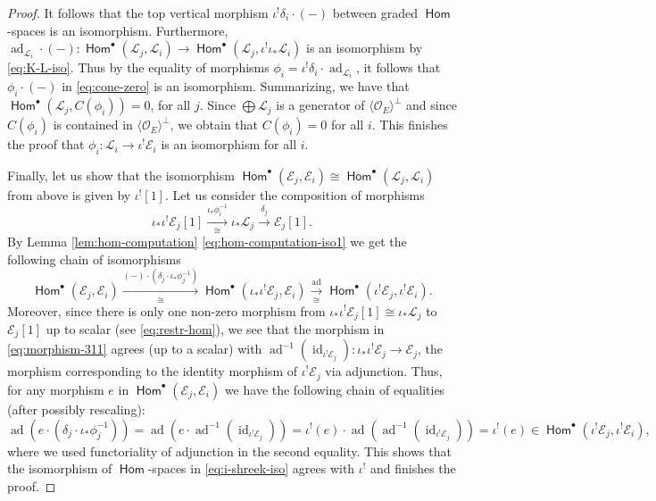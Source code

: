 \documentclass[a4paper,11pt, reqno]{amsart}
\def\OO{\mathcal O}
\def\sE{\mathscr{E}}
\def\sL{\mathscr{L}}
\def\id{{\operatorname{id}}}
\def\ad{{\operatorname{ad}}}
\newcommand{\opname}[1]{\operatorname{\mathsf{#1}}}
\newcommand{\Hom}{\opname{Hom}}
\theoremstyle{plain}
\theoremstyle{definition}
\numberwithin{equation}{section}
\newlength{\arrow}
\begin{document}
\begin{proof}
It follows that the top vertical morphism $  \iota^! \delta_i  \cdot (-)$ between graded $\Hom$-spaces is an isomorphism.
Furthermore,  $ \ad_{\sL_i } \cdot (-) : \Hom^\bullet ( \sL_j , \sL_i  ) \to \Hom^\bullet (  \sL_j , \iota^! \iota_\ast\sL_i )$ is an isomorphism by \eqref{eq:K-L-iso}.
Thus by the equality of morphisms $\phi_ i =   \iota^! \delta_i \cdot \ad_{\sL_i }$, it follows that 
$ \phi_i \cdot (- ) $ in \eqref{eq:cone-zero}
is an isomorphism.
Summarizing, we have that $\Hom^\bullet (  \sL_j , C ( \phi_i )  ) = 0$, for all $j$.
Since $\bigoplus  \sL_j $ is a generator of 
$\langle\OO_E \rangle^\perp$ and since $C ( \phi_i )$ is contained in $\langle\OO_E \rangle^\perp$, we obtain that $C ( \phi_i ) = 0$ for all $i$.
This finishes the proof that $\phi_i \colon \sL_i \to \iota^! \sE_i$ is an isomorphism for all $i$.
    

Finally, let us show that the isomorphism $\Hom^\bullet ( \sE_j , \sE_i  ) \cong \Hom^\bullet (\sL_j , \sL_i )$ from above is given by $\iota^! [1]$. 
Let us consider the composition of morphisms
\begin{equation}\label{eq:morphism-311}
 \iota_\ast \iota^! \sE_j [1] \xrightarrow[\cong]{\iota_\ast \phi_i^{-1}}   \iota_\ast \sL_j \xrightarrow{\delta_j} \sE_j [1] .
\end{equation}
By Lemma \ref{lem:hom-computation} \eqref{eq:hom-computation-iso1} we get the following chain of isomorphisms
\begin{equation}\label{eq:i-shreek-iso}
    \Hom^\bullet (  \sE_j ,  \sE_i ) \xrightarrow[{\cong}]{(-) \cdot ( \delta_j \cdot \iota_\ast\phi_j^{-1} ) } \Hom^\bullet ( \iota_\ast \iota^!  \sE_j  ,  \sE_i ) \xrightarrow[\cong]{\ad} \Hom^\bullet ( \iota^!  \sE_j  , \iota^!  \sE_i ) .
\end{equation}
Moreover, since there is only one non-zero morphism from  $\iota_\ast \iota^! \sE_j [1] \cong \iota_\ast \sL_j$ to $\sE_j [1]$ up to scalar (see \eqref{eq:restr-hom}),
we see that the morphism in \eqref{eq:morphism-311} agrees (up to a scalar) with $\ad^{-1} ( \id_{\iota^!\sE_j} ) \colon \iota_\ast \iota^! \sE_j \to \sE_j$, the morphism corresponding to the identity morphism of $\iota^!\sE_j $ via adjunction.
Thus, for any morphism $e$ in $\Hom^\bullet ( \sE_j , \sE_i )$ we have the following chain of equalities (after possibly rescaling):
\[
 \ad ( e \cdot ( \delta_j \cdot \iota_\ast\phi_j^{-1} ) ) =  \ad ( e \cdot \ad^{-1} ( \id_{\iota^!\sE_j} ) ) = \iota^!(e) \cdot \ad (  \ad^{-1} ( \id_{\iota^!\sE_j} ) ) = \iota^!(e) \in \Hom^\bullet ( \iota^! \sE_j , \iota^! \sE_i ) ,
\]
where we used functoriality of adjunction in the second equality.
This shows that the isomorphism of $\Hom$-spaces in \eqref{eq:i-shreek-iso} agrees with $\iota^!$ and finishes the proof.
\end{proof}
\end{document}
